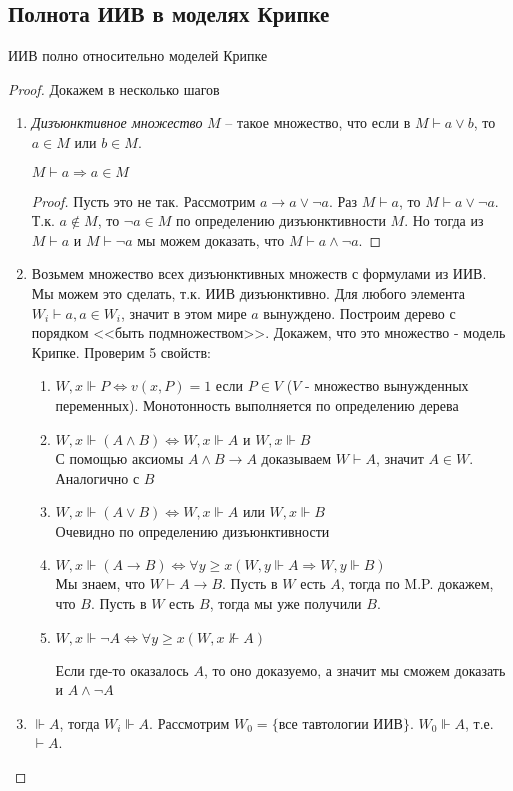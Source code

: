 \subsection{Полнота ИИВ в моделях Крипке}
\label{sec-6-4}
\begin{theorem}
ИИВ полно относительно моделей Крипке
\end{theorem}
\begin{proof}
Докажем в несколько шагов
\begin{enumerate}
\item \emph{Дизъюнктивное множество} $M$ -- такое множество, что если в $M \vdash a \vee b$, то $a \in M$ или $b \in M$.
\begin{lemma}
$M \vdash a \Rightarrow a \in M$
\end{lemma}
\begin{proof}
Пусть это не так. Рассмотрим $a \rightarrow a \vee \neg a$. Раз $M \vdash a$, то $M \vdash a \vee \neg a$. Т.к. $a \notin M$, то $\neg a \in M$ по определению дизъюнктивности $M$. Но тогда из $M \vdash a$ и $M \vdash \neg a$ мы можем доказать, что $M \vdash a \land \neg a$.
\end{proof}
\item Возьмем множество всех дизъюнктивных множеств с формулами из ИИВ. Мы можем это сделать, т.к. ИИВ дизъюнктивно. Для любого элемента $W_{i} \vdash a, a \in W_{i}$, значит в этом мире $a$ вынуждено. Построим дерево с порядком <<быть подмножеством>>. Докажем, что это множество - модель Крипке. Проверим 5 свойств:
\begin{enumerate}
\item $W, x \Vdash P \Leftrightarrow v(x, P) = 1$ если $P \in V$ ($V$ - множество вынужденных переменных). Монотонность выполняется по определению дерева
\item $W, x \Vdash (A \land B) \Leftrightarrow W, x \Vdash A$ и $W, x \Vdash B$\\
С помощью аксиомы $A \land B \rightarrow A$ доказываем $W \vdash A$, значит $A \in W$. Аналогично с $B$
\item $W, x \Vdash (A \vee B) \Leftrightarrow W, x \Vdash A$ или $W, x \Vdash B$\\
Очевидно по определению дизъюнктивности
\item $W, x \Vdash (A \rightarrow B) \Leftrightarrow \forall y \geq x (W, y \Vdash A \Rightarrow W, y \Vdash B)$\\
Мы знаем, что $W \vdash A \rightarrow B$. Пусть в $W$ есть $A$, тогда по M.P. докажем, что $B$. Пусть в $W$ есть $B$, тогда мы уже получили $B$.
\item $W, x \Vdash \neg A \Leftrightarrow \forall y \geq x (W, x \nVdash A)$

Если где-то оказалось $A$, то оно доказуемо, а значит мы сможем доказать и $A \land \neg A$
\end{enumerate}
\item $\Vdash A$, тогда $W_{i} \Vdash A$. Рассмотрим $W_{0} = \lbrace$все тавтологии ИИВ$\rbrace$. $W_{0} \Vdash A$, т.е. $\vdash A$.
\end{enumerate}
\end{proof}

